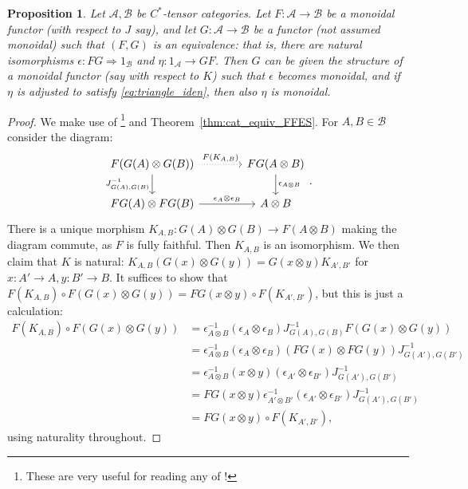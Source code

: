 \documentclass[a4paper,11pt]{article}
\theoremstyle{plain}
\newtheorem{proposition}{Proposition}[section]
\theoremstyle{remark}
\newcommand{\mc}[1]{\mathcal{#1}}
\begin{document}
\begin{proposition}\label{prop:upgrade_to_monoidal_equiv}
Let $\mc A,\mc B$ be $C^*$-tensor categories.  Let $F\colon \mc A \to \mc B$ be a monoidal functor (with respect to $J$ say), and let $G\colon \mc A \to \mc B$ be a functor (not assumed monoidal) such that $(F,G)$ is an equivalence: that is, there are natural isomorphisms $\epsilon \colon FG\Rightarrow 1_{\mc B}$ and $\eta\colon 1_{\mc A} \to GF$.  Then $G$ can be given the structure of a monoidal functor (say with respect to $K$) such that $\epsilon$ becomes monoidal, and if $\eta$ is adjusted to satisfy \eqref{eq:triangle_iden}, then also $\eta$ is monoidal.
\end{proposition}
\begin{proof}
We make use of \cite{JT_Notes}\footnote{These are very useful for reading any of \cite{EGNO_TensorCategories}!} and Theorem~\ref{thm:cat_equiv_FFES}.  For $A,B\in\mc B$ consider the diagram:
\[\begin{tikzcd}[column sep=9ex]
  F(G(A)\otimes G(B)) \ar[d, "J_{G(A), G(B)}^{-1}"'] \ar[r, dotted, "F(K_{A,B})"]
   & FG(A\otimes B) \ar[d, "\epsilon_{A\otimes B}"] \\
  FG(A) \otimes FG(B) \ar[r, "\epsilon_A\otimes\epsilon_B"] & A\otimes B
\end{tikzcd}. \]
There is a unique morphism $K_{A,B} \colon G(A)\otimes G(B) \to F(A\otimes B)$ making the diagram commute, as $F$ is fully faithful.  Then $K_{A,B}$ is an isomorphism.  We then claim that $K$ is natural: $K_{A,B}(G(x)\otimes G(y)) = G(x\otimes y)K_{A',B'}$ for $x\colon A'\to A, y\colon B'\to B$.  It suffices to show that $F(K_{A,B}) \circ F(G(x)\otimes G(y)) = FG(x\otimes y) \circ F(K_{A',B'})$, but this is just a calculation:
\begin{align*}
F(K_{A,B}) \circ F(G(x)\otimes G(y))
&= \epsilon_{A\otimes B}^{-1} (\epsilon_A\otimes\epsilon_B) J^{-1}_{G(A), G(B)} F(G(x)\otimes G(y)) \\
&= \epsilon_{A\otimes B}^{-1} (\epsilon_A\otimes\epsilon_B) (FG(x) \otimes FG(y)) J^{-1}_{G(A'), G(B')} \\
&= \epsilon_{A\otimes B}^{-1} (x\otimes y) (\epsilon_{A'}\otimes\epsilon_{B'}) J^{-1}_{G(A'), G(B')} \\
&= FG(x\otimes y)\epsilon_{A'\otimes B'}^{-1} (\epsilon_{A'}\otimes\epsilon_{B'}) J^{-1}_{G(A'), G(B')} \\
&=  FG(x\otimes y) \circ F(K_{A',B'}),
\end{align*}
using naturality throughout.


\end{proof}
\end{document}
